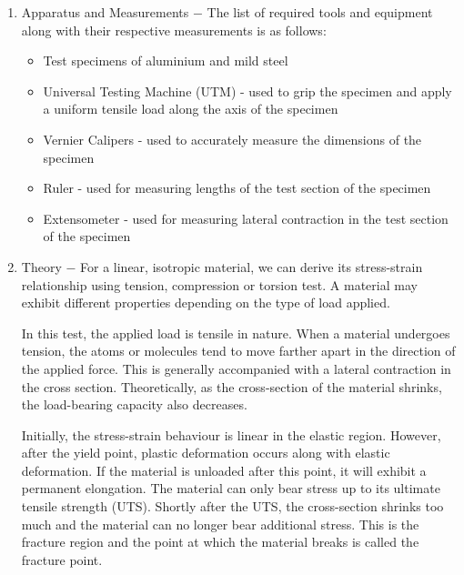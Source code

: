\documentclass[a4paper, 11pt]{article}
\begin{document}
\begin{enumerate}[label=(\alph*)]
	\item { Apparatus and Measurements} $-$ The list of required tools and equipment along with their respective measurements is as follows:
\vspace{-2mm}

	\begin{itemize}
		\item Test specimens of aluminium and mild steel 
		\item Universal Testing Machine (UTM) - used to grip the specimen and apply a uniform tensile load along the axis of the specimen 
		\item Vernier Calipers - used to accurately measure the dimensions of the specimen
		\item Ruler - used for measuring lengths of the test section of the specimen
		\item Extensometer - used for measuring lateral contraction in the test section of the specimen
	\end{itemize}
	
	\item {Theory} $-$ For a linear, isotropic material, we can derive its stress-strain relationship using tension, compression or torsion test. A material may exhibit different properties depending on the type of load applied.
	
	In this test, the applied load is tensile in nature. When a material undergoes tension, the atoms or molecules tend to move farther apart in the direction of the applied force. This is generally accompanied with a lateral contraction in the cross section. Theoretically, as the cross-section of the material shrinks, the load-bearing capacity also decreases.
	
	Initially, the stress-strain behaviour is linear in the elastic region. However, after the yield point, plastic deformation occurs along with elastic deformation. If the material is unloaded after this point, it will exhibit a permanent elongation. The material can only bear stress up to its ultimate tensile strength (UTS). Shortly after the UTS, the cross-section shrinks too much and the material can no longer bear additional stress. This is the fracture region and the point at which the material breaks is called the fracture point.


\end{enumerate}
\end{document}
